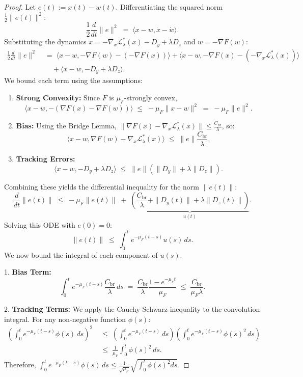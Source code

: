 \documentclass{article}
\newcommand{\1}{\mathbf{1}}
\begin{document}
\begin{proof}
    Let $e(t) := x(t) - w(t)$. Differentiating the squared norm $\frac{1}{2}\|e(t)\|^2$:
    \[
    \frac{1}{2}\frac{d}{dt}\|e\|^2 \;=\; \langle x-w, \dot x - \dot w \rangle.
    \]
    Substituting the dynamics $\dot x = -\nabla_x \mathcal L_\lambda^*(x) - D_y + \lambda D_z$ and $\dot w = -\nabla F(w)$:
    \begin{align*}
        \frac{1}{2}\frac{d}{dt}\|e\|^2 
        \;&=\; \langle x-w, -\nabla F(w) - (-\nabla F(x)) \rangle + \langle x-w, -\nabla F(x) - (-\nabla_x \mathcal L_\lambda^*(x)) \rangle \\
        &\quad + \langle x-w, -D_y + \lambda D_z \rangle.
    \end{align*}
    We bound each term using the assumptions:
    \begin{enumerate}[label=(\roman*)]
        \item \textbf{Strong Convexity:} Since $F$ is $\mu_F$-strongly convex,
        \[
        \langle x-w, -(\nabla F(x) - \nabla F(w)) \rangle \;\le\; -\mu_F \|x-w\|^2 \;=\; -\mu_F \|e\|^2.
        \]
        \item \textbf{Bias:} Using the Bridge Lemma, $\|\nabla F(x) - \nabla_x \mathcal L_\lambda^*(x)\| \le \frac{C_{\mathrm{br}}}{\lambda}$, so:
        \[
        \langle x-w, \nabla F(w) - \nabla_x \mathcal L_\lambda^*(x) \rangle \;\le\; \|e\| \frac{C_{\mathrm{br}}}{\lambda}.
        \]
        \item \textbf{Tracking Errors:}
        \[
        \langle x-w, -D_y + \lambda D_z \rangle \;\le\; \|e\| (\|D_y\| + \lambda \|D_z\|).
        \]
    \end{enumerate}
    Combining these yields the differential inequality for the norm $\|e(t)\|$:
    \[
    \frac{d}{dt}\|e(t)\| \;\le\; -\mu_F \|e(t)\| \;+\; \underbrace{\left( \frac{C_{\mathrm{br}}}{\lambda} + \|D_y(t)\| + \lambda \|D_z(t)\| \right)}_{u(t)}.
    \]
    Solving this ODE with $e(0)=0$:
    \[
    \|e(t)\| \;\le\; \int_0^t e^{-\mu_F(t-s)} u(s) \, ds.
    \]
    We now bound the integral of each component of $u(s)$.
    
    1. \textbf{Bias Term:}
    \[
    \int_0^t e^{-\mu_F(t-s)} \frac{C_{\mathrm{br}}}{\lambda} \, ds \;=\; \frac{C_{\mathrm{br}}}{\lambda} \frac{1 - e^{-\mu_F t}}{\mu_F} \;\le\; \frac{C_{\mathrm{br}}}{\mu_F \lambda}.
    \]
    
    2. \textbf{Tracking Terms:} We apply the Cauchy-Schwarz inequality to the convolution integral. For any non-negative function $\phi(s)$:
    \begin{align*}
        \left( \int_0^t e^{-\mu_F(t-s)} \phi(s) \, ds \right)^2 
        \;&\le\; \left( \int_0^t e^{-\mu_F(t-s)} \, ds \right) \left( \int_0^t e^{-\mu_F(t-s)} \phi(s)^2 \, ds \right) \\
        \;&\le\; \frac{1}{\mu_F} \int_0^t \phi(s)^2 \, ds.
    \end{align*}
    Therefore, $\int_0^t e^{-\mu_F(t-s)} \phi(s) \, ds \le \frac{1}{\sqrt{\mu_F}} \sqrt{\int_0^t \phi(s)^2 ds}$.
    

\end{proof}
\end{document}
